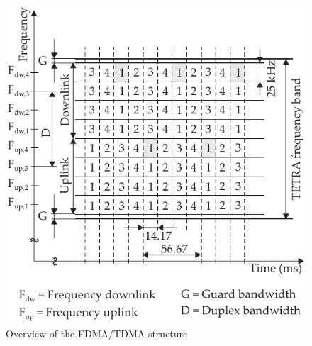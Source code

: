 \begin{figure}[htb]
	\centering
		\includegraphics[]{../kapitel04/figures/physical_channel.pdf}
	\caption{Overview of the FDMA/TDMA structure}
	\label{fig:physical_channel}
\end{figure}

